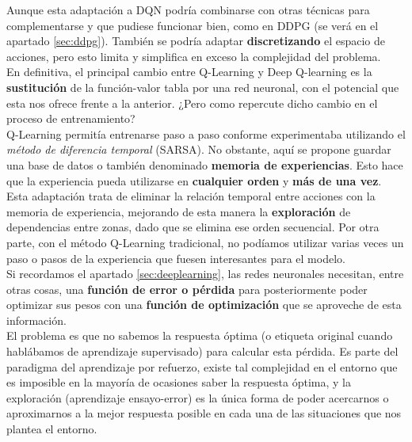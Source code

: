 \documentclass[11pt,fleqn]{book} %
\begin{document}
Aunque esta adaptación a DQN podría combinarse con otras técnicas para complementarse y que pudiese funcionar bien, como en DDPG (se verá en el apartado \ref{sec:ddpg}). También se podría adaptar \textbf{discretizando} el espacio de acciones, pero esto limita y simplifica en exceso la complejidad del problema. \\


En definitiva, el principal cambio entre Q-Learning y Deep Q-learning es la \textbf{sustitución} de la función-valor tabla por una red neuronal, con el potencial que esta nos ofrece frente a la anterior. ¿Pero como repercute dicho cambio en el proceso de entrenamiento? \\

Q-Learning permitía entrenarse paso a paso conforme experimentaba utilizando el \textit{método de diferencia temporal} (SARSA). No obstante, aquí se propone guardar una base de datos o también denominado \textbf{memoria de experiencias}. Esto hace que la experiencia pueda utilizarse en \textbf{cualquier orden} y \textbf{más de una vez}.\\

Esta adaptación trata de eliminar la relación temporal entre acciones con la memoria de experiencia, mejorando de esta manera la \textbf{exploración} de dependencias entre zonas, dado que se elimina ese orden secuencial. Por otra parte, con el método Q-Learning tradicional, no podíamos utilizar varias veces un paso o pasos de la experiencia que fuesen interesantes para el modelo. \\

Si recordamos el apartado \ref{sec:deeplearning}, las redes neuronales necesitan, entre otras cosas, una \textbf{función de error o pérdida} para posteriormente poder optimizar sus pesos con una \textbf{función de optimización} que se aproveche de esta información. \\

El problema es que no sabemos la respuesta óptima (o etiqueta original cuando hablábamos de aprendizaje supervisado) para calcular esta pérdida. Es parte del paradigma del aprendizaje por refuerzo, existe tal complejidad en el entorno que es imposible en la mayoría de ocasiones saber la respuesta óptima, y la exploración (aprendizaje ensayo-error) es la única forma de poder acercarnos o aproximarnos a la mejor respuesta posible en cada una de las situaciones que nos plantea el entorno. \\
\end{document}
